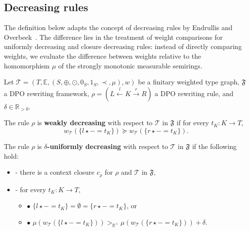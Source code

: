 
        
\subsection{Decreasing rules}
\label{nwf:sec:decreasing_rules}
The definition below adapts the concept of decreasing rules by Endrullis and Overbeek~\cite{endrullis2024generalized_arxiv_v2}. The difference lies in the treatment of weight comparisons for uniformly decreasing and closure decreasing rules: instead of directly comparing weights, we evaluate the difference between weights relative to the homomorphism $\mu$ of the strongly monotonic measurable semirings.

\begin{definition} 
    \label{nwf:def:decreasing_rule}
    Let $\mathcal{T} = (T,\mathbb{E}, (S, \oplus, \odot, 0_S, 1_S, \prec, \mu), w)$ be a finitary weighted type graph, \(\mathfrak{F}\) a DPO rewriting framework, $\rho = (L \overset{l}{\leftarrow} K \overset{r}{\rightarrow} R)$ a DPO rewriting rule, and $\delta \in \mathbb{R}_{>0}$. 

    \noindent
    The rule $\rho$ is \textbf{weakly decreasing} with respect to $\mathcal{T}$ in $\mathfrak{F}$ if 
            for every $t_K : K \to T$,
                $$ 
                  w_\mathcal{T}(\{l \star - = t_K\}) \succeq w_\mathcal{T}(\{r\star - = t_K\}).$$
           
    \noindent
    The rule $\rho$ is \textbf{$\delta$-uniformly decreasing} with respect to $\mathcal{T}$ in $\mathfrak{F}$ if the following hold:
        \begin{itemize}
            \item[]- there is a context closure $c_\rho$ for $\rho$ and $\mathcal{T}$ in $\mathfrak{F}$, 
            \item[]- for every $t_K : K \to T$,
            \begin{itemize}
                \item[] $\bullet$ $\{l \star - = t_K\} = \emptyset = \{r \star - = t_K\}$, or
                \item[] $\bullet$ $\mu(w_\mathcal{T}(\{l \star - = t_K\}))  >_{\mathbb{R}^+}   \mu(w_\mathcal{T}(\{r \star - = t_K\})) + \delta$.
            \end{itemize}
        \end{itemize}  
         

\end{definition}
